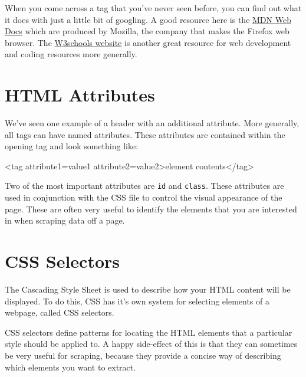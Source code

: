 \documentclass[
  letterpaper,
  DIV=11,
  numbers=noendperiod]{scrreprt}
\newenvironment{Shaded}{\begin{snugshade}}{\end{snugshade}}
\newcommand{\DataTypeTok}[1]{\textcolor[rgb]{0.68,0.00,0.00}{#1}}
\newcommand{\KeywordTok}[1]{\textcolor[rgb]{0.00,0.23,0.31}{#1}}
\newcommand{\NormalTok}[1]{\textcolor[rgb]{0.00,0.23,0.31}{#1}}
\newcommand{\OperatorTok}[1]{\textcolor[rgb]{0.37,0.37,0.37}{#1}}
\newcommand{\OtherTok}[1]{\textcolor[rgb]{0.00,0.23,0.31}{#1}}
\newcommand{\StringTok}[1]{\textcolor[rgb]{0.13,0.47,0.30}{#1}}
\begin{document}
When you come across a tag that you've never seen before, you can find
out what it does with just a little bit of googling. A good resource
here is the \href{https://developer.mozilla.org/en-US/docs/Web/HTML}{MDN
Web Docs} which are produced by Mozilla, the company that makes the
Firefox web browser. The
\href{https://www.w3schools.com/html/default.asp}{W3schools website} is
another great resource for web development and coding resources more
generally.

\section{HTML Attributes}\label{html-attributes}

We've seen one example of a header with an additional attribute. More
generally, all tags can have named attributes. These attributes are
contained within the opening tag and look something like:

\begin{Shaded}
\begin{Highlighting}[]
\DataTypeTok{\textless{}}\KeywordTok{tag}\OtherTok{ attribute1}\OperatorTok{=}\StringTok{\textquotesingle{}value1\textquotesingle{}}\OtherTok{ attribute2}\OperatorTok{=}\StringTok{\textquotesingle{}value2\textquotesingle{}}\DataTypeTok{\textgreater{}}\NormalTok{element contents}\DataTypeTok{\textless{}/}\KeywordTok{tag}\DataTypeTok{\textgreater{}}
\end{Highlighting}
\end{Shaded}

Two of the most important attributes are \texttt{id} and \texttt{class}.
These attributes are used in conjunction with the CSS file to control
the visual appearance of the page. These are often very useful to
identify the elements that you are interested in when scraping data off
a page.

\section{CSS Selectors}\label{css-selectors}

The Cascading Style Sheet is used to describe how your HTML content will
be displayed. To do this, CSS has it's own system for selecting elements
of a webpage, called CSS selectors.

CSS selectors define patterns for locating the HTML elements that a
particular style should be applied to. A happy side-effect of this is
that they can sometimes be very useful for scraping, because they
provide a concise way of describing which elements you want to extract.
\end{document}
